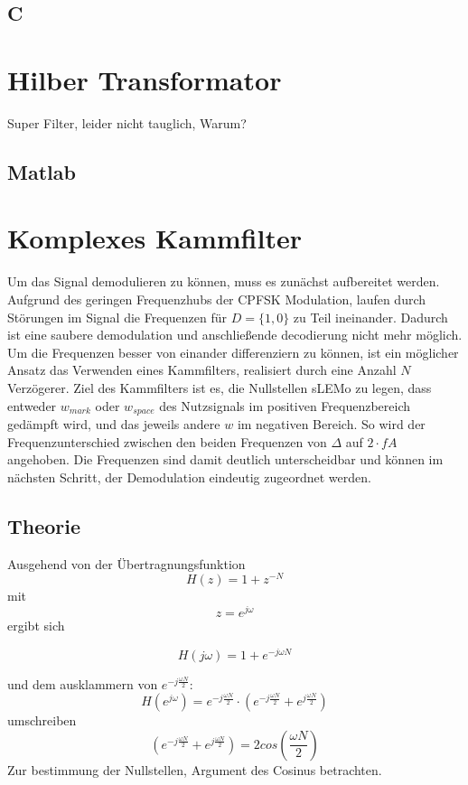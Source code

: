 \documentclass{article}
\begin{document}
\subsection{C}

\section{Hilber Transformator}\label{sec:hilbert}
Super Filter, leider nicht tauglich, Warum?

\subsection{Matlab}

\section{Komplexes Kammfilter}\label{sec:comb}
Um das Signal demodulieren zu können, muss es zunächst aufbereitet werden. 
Aufgrund des geringen Frequenzhubs der CPFSK Modulation, laufen durch Störungen im Signal die Frequenzen 
für $D = \{1, 0\}$ zu Teil ineinander. Dadurch ist eine saubere demodulation und anschließende decodierung
nicht mehr möglich. Um die Frequenzen besser von einander differenziern zu können, ist ein möglicher Ansatz 
das Verwenden eines Kammfilters, realisiert durch eine Anzahl $N$ Verzögerer.
Ziel des Kammfilters ist es, die Nullstellen sLEMo zu legen, dass entweder $w_{mark}$ oder $w_{space}$ des Nutzsignals im positiven Frequenzbereich
gedämpft wird, und das jeweils andere $w$ im negativen Bereich. So wird der Frequenzunterschied zwischen den beiden Frequenzen von $\varDelta$ auf $2\cdot fA$ angehoben.
Die Frequenzen sind damit deutlich unterscheidbar und können im nächsten Schritt, der Demodulation eindeutig zugeordnet werden.

\subsection{Theorie}


Ausgehend von der Übertragnungsfunktion 
$$H(z) = 1 + z^{-N}$$ 
mit 
$$ z = e^{j\omega} $$
ergibt sich

$$H(j\omega) = 1 + e^{-j\omega N}$$

und dem ausklammern von $ e^{-j \frac{\omega N}{2}}$:
$$
H(e^{j\omega}) = e^{-j \frac{\omega N}{2}} \cdot (e^{-j \frac{\omega N}{2}} + e^{j \frac{\omega N}{2}})
$$
umschreiben
$$
(e^{-j \frac{\omega N}{2}} + e^{j \frac{\omega N}{2}}) = 2  cos(\frac{\omega N}{2})
$$
Zur bestimmung der Nullstellen, Argument des Cosinus betrachten.
\end{document}
